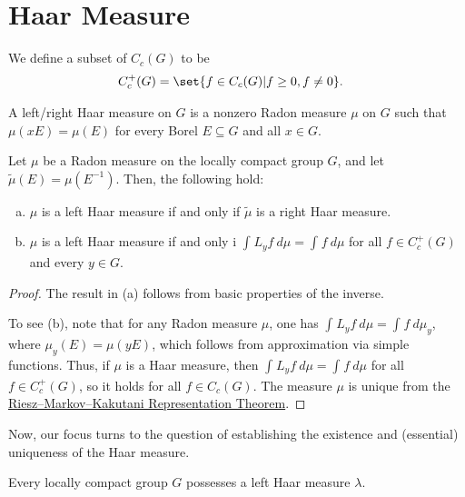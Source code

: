 \documentclass[10pt]{mypackage}
\begin{document}
\section{Haar Measure}%
\begin{definition}
We define a subset of $C_c(G)$ to be
\begin{align*}
  C_c^{+}(G) &= \set{f\in C_c(G) | f\geq 0,f\neq 0}.
\end{align*}
\end{definition}
\begin{definition}
  A left/right Haar measure on $G$ is a nonzero Radon measure $\mu$ on $G$ such that $\mu\left( xE \right) = \mu\left( E \right)$ for every Borel $E\subseteq G$ and all $x\in G$.
\end{definition}
\begin{proposition}
  Let $\mu$ be a Radon measure on the locally compact group $G$, and let $ \widetilde{\mu}\left( E \right) = \mu\left( E^{-1} \right) $. Then, the following hold:
  \begin{enumerate}[(a)]
    \item $\mu$ is a left Haar measure if and only if $ \widetilde{\mu} $ is a right Haar measure.
    \item $\mu$ is a left Haar measure if and only i $ \int_{}^{} L_yf\:d\mu = \int_{}^{} f\:d\mu $ for all $f\in C_c^{+}\left( G \right)$ and every $y\in G$.
  \end{enumerate}
\end{proposition}
\begin{proof}
  The result in (a) follows from basic properties of the inverse.\newline

  To see (b), note that for any Radon measure $\mu$, one has $\int_{}^{} L_yf\:d\mu = \int_{}^{} f\:d\mu_y$, where $\mu_y(E) = \mu\left( yE \right)$, which follows from approximation via simple functions. Thus, if $\mu$ is a Haar measure, then $\int_{}^{} L_yf\:d\mu = \int_{}^{} f\:d\mu$ for all $f\in C_c^{+}(G)$, so it holds for all $f\in C_c\left( G \right)$. The measure $\mu$ is unique from the \href{https://desvl.xyz/2020/09/19/The-Riesz-Markov-Kakutani-Representation-Theorem/#This-post}{Riesz--Markov--Kakutani Representation Theorem}.
\end{proof}
Now, our focus turns to the question of establishing the existence and (essential) uniqueness of the Haar measure.
\begin{theorem}
  Every locally compact group $G$ possesses a left Haar measure $\lambda$.
\end{theorem}
\end{document}
